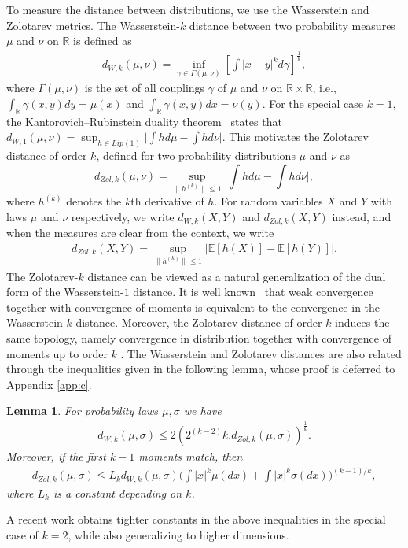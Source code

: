 \documentclass[11pt,letterpaper,reqno]{article}
\theoremstyle{thmstyleone}%
\theoremstyle{thmstyletwo}%
\newtheorem{lemma}{Lemma}
\theoremstyle{thmstylethree}%
\numberwithin{equation}{section}
\begin{document}
To measure the distance between distributions, we use the Wasserstein and Zolotarev metrics. The Wasserstein-$k$ distance between two probability measures $\mu$ and $\nu$ on $\mathbb{R}$ is defined as
\begin{align*}
    d_{W,k}(\mu,\nu)=\inf_{\gamma \in \Gamma(\mu,\nu)} \left[ \int |x-y|^k d \gamma \right]^{\frac{1}{k}} ,
\end{align*}
where $\Gamma(\mu,\nu)$ is the set of all couplings $\gamma$ of $\mu$ and $\nu$ on $\mathbb{R} \times \mathbb{R}$, i.e., $\int_{\mathbb R} \gamma(x,y)dy=\mu(x)$ and $\int_{\mathbb R} \gamma(x,y)dx=\nu(y).$
For the special case $k=1$, the Kantorovich–Rubinstein duality theorem~\cite{Villani} states that
$d_{W,1}(\mu,\nu)=\sup_{h \in Lip(1)} \big|\int h d\mu-\int h d\nu \big|.$
This motivates the Zolotarev distance of order $k$, defined for two probability distributions $\mu$ and $\nu$ as 
\begin{equation}\label{eq:zol}
    d_{Zol,k}(\mu,\nu)=\sup_{\|h^{(k)}\| \leq 1}  \bigg|\int h d\mu-\int h d\nu \bigg|,
\end{equation}
where $h^{(k)}$ denotes the $k$th derivative of $h$.
For random variables $X$ and $Y$ with laws $\mu$ and $\nu$ respectively, we write $d_{W,k}(X,Y)$ and $d_{Zol,k}(X,Y)$ instead, and when the measures are clear from the context, we write
\begin{align}\label{zolh}
    d_{Zol,k}(X,Y)=\sup_{\|h^{(k)}\| \leq 1} |\mathbb E[h(X)]-\mathbb E[h(Y)]|.
\end{align}
The Zolotarev-$k$ distance can be viewed as a natural generalization of the dual form of the Wasserstein-$1$ distance. %
It is well known~\cite[Theorem 6.9]{Villani} that weak convergence together with convergence of moments is equivalent to the convergence in the Wasserstein $k$-distance. Moreover, the Zolotarev distance of order $k$ induces the same topology, namely convergence in distribution together with convergence of moments up to order $k$ \cite{MF,BDS}.
The Wasserstein and Zolotarev distances are also related through the  inequalities given in the following lemma, whose proof is deferred to Appendix \ref{app:c}.
\begin{lemma}\label{lemmadistancebound}
   For probability laws $\mu,\sigma$ we have 
    \begin{align}\label{bound Wasserstein}
        d_{W,k}(\mu, \sigma) \leq 2(2^{(k-2)}k.d_{Zol,k}(\mu, \sigma))^{\frac{1}{k}}.
    \end{align}
Moreover, if the first $k-1$ moments match, then
\begin{align}
    d_{Zol,k}(\mu,\sigma) \leq L_k d_{W,k}(\mu, \sigma)\bigg(\int |x|^k \mu(dx) +\int |x|^k \sigma(dx)\bigg)^{(k-1)/k},
\end{align}
where $L_k$ is a constant depending on $k$.
\end{lemma}
A recent work \cite{BB25} obtains tighter constants in the above inequalities in the special case of $k=2$, while also generalizing to higher dimensions. 
\end{document}
